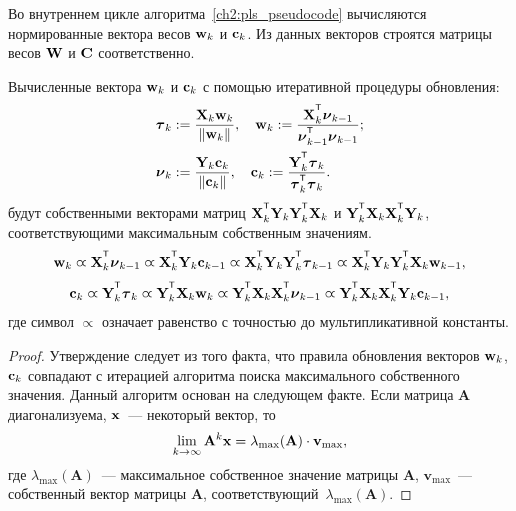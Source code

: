 Во внутреннем цикле алгоритма~\ref{ch2:pls_pseudocode} вычисляются нормированные вектора весов $\mathbf{w}_k$ и $\mathbf{c}_k$. 
Из данных векторов строятся матрицы весов $\mathbf{W}$ и $\mathbf{C}$ соответственно.

\begin{statement}
	Вычисленные вектора $\mathbf{w}_k$ и $\mathbf{c}_k$ с помощью итеративной процедуры обновления:
	\begin{align}
		\btau_k &:= \frac{\bX_k \bw_k}{\|\bw_k\|}, \quad  \bw_k := \frac{\bX_k^{\T} \bnu_{k-1}}{\bnu_{k-1}^{\T} \bnu_{k-1}}; \label{ch2:eq:pls_step1}\\ 
		\bnu_k &:= \frac{\bY_k \bc_k}{\| \bc_k \|}, \quad \bc_k := \frac{\bY_k^{\T} \btau_k}{\btau_k^{\T} \btau_k}. \label{ch2:eq:pls_step2}
	\end{align}
	будут собственными векторами матриц $\bX_k^{\T} \bY_k \bY_k^{\T} \bX_k$ и $\bY_k^{\T} \bX_k \bX_k^{\T} \bY_k$, соответствующими максимальным собственным значениям.
	\begin{equation*}
		\bw_k \varpropto \bX_k^{\T} \bnu_{k-1} \varpropto \bX_k^{\T} \bY_k \bc_{k-1} \varpropto \bX_k^{\T} \bY_k \bY_k^{\T} \btau_{k-1} \varpropto \bX_k^{\T} \bY_k \bY_k^{\T} \bX_k \bw_{k-1},
	\end{equation*}
	\begin{equation*}
		\bc_k \varpropto \bY_k^{\T} \btau_k \varpropto \bY_k^{\T} \bX_k \bw_k \varpropto \bY_k^{\T} \bX_k \bX_k^{\T} \bnu_{k-1} \varpropto \bY_k^{\T} \bX_k \bX_k^{\T} \bY_k \bc_{k-1},
	\end{equation*}
	где символ $\varpropto$ означает равенство с точностью до мультипликативной константы. 
	\label{ch2:stat:eig}
\end{statement}
\begin{proof}
	Утверждение следует из того факта, что правила обновления векторов $\mathbf{w}_k$, $\mathbf{c}_k$ совпадают с итерацией алгоритма поиска максимального собственного значения. 
	Данный алгоритм основан на следующем факте.
	Если матрица $\mathbf{A}$ диагонализуема, $\mathbf{x}$~--- некоторый вектор, то
	\[
	\lim_{k \rightarrow \infty} \mathbf{A}^k \mathbf{x} = \lambda_{\max}(\mathbf{A}) \cdot \mathbf{v}_{\max},
	\]
	где $ \lambda_{\max} (\mathbf{A})$~--- максимальное собственное значение матрицы $\mathbf{A}$, $\mathbf{v}_{\max}$~--- собственный вектор матрицы $\mathbf{A}$, соответствующий~$\lambda_{\max} (\mathbf{A})$.
\end{proof}

